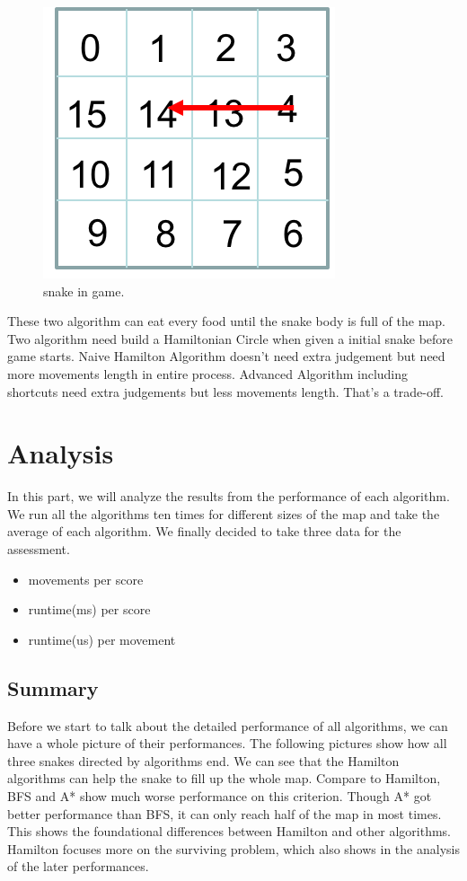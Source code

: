 \documentclass[12pt]{article}
\begin{document}
\begin{figure}[H]
\centering 
\includegraphics[scale = 0.8]{Picture3.png}
\caption{snake in game.}
\label{fig:figure4label}
\end{figure}

These two algorithm can eat every food until the snake body is full of the map. Two algorithm need build a Hamiltonian Circle when given a initial snake before game starts. Naive Hamilton Algorithm doesn't need extra judgement but need more movements length in entire process. Advanced Algorithm including shortcuts need extra judgements but less movements length. That's a trade-off.

\section{Analysis}

In this part, we will analyze the results from the performance of each algorithm. We run all the algorithms ten times for different sizes of the map and take the average of each algorithm. We finally decided to take three data for the assessment.
\begin{itemize}
    \item movements per score
    \item runtime(ms) per score
    \item runtime(us) per movement
\end{itemize}

\subsection{Summary}

Before we start to talk about the detailed performance of all algorithms, we can have a whole picture of their performances. The following pictures show how all three snakes directed by algorithms end. We can see that the Hamilton algorithms can help the snake to fill up the whole map. Compare to Hamilton, BFS and A* show much worse performance on this criterion. Though A* got better performance than BFS, it can only reach half of the map in most times. This shows the foundational differences between Hamilton and other algorithms. Hamilton focuses more on the surviving problem, which also shows in the analysis of the later performances.
\end{document}
